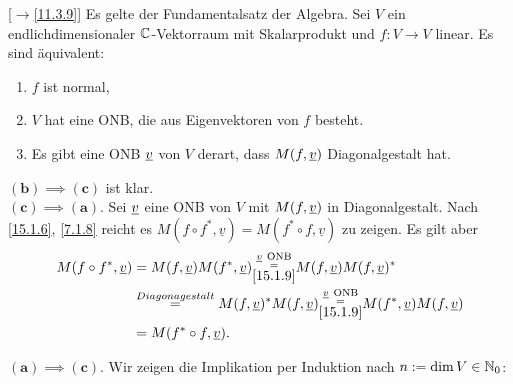 \documentclass[../../main.tex]{subfiles}
\begin{document}
\begin{sat}\mbox{}[$\to$\ref{11.3.9}]
\label{15.2.4}
Es gelte der Fundamentalsatz der Algebra. Sei $V$ ein endlichdimensionaler $\mathbb C$-Vektorraum mit Skalarprodukt und $f: V\to V$ linear. Es sind äquivalent:
\begin{enumerate}[\normalfont(a)]
\item $f$ ist normal,
\item $V$ hat eine ONB, die aus Eigenvektoren von $f$ besteht.
\item Es gibt eine ONB ${\underline v}$ von $V$ derart, dass $M(f,{\underline v})$ Diagonalgestalt hat.
\end{enumerate}
\end{sat}
\begin{cproof}
$\boldsymbol{(b)\implies(c)}$ ist klar.\\
	
\noindent$\boldsymbol{(c)\implies(a)}$. Sei ${\underline v}$ eine ONB von $V$ mit $M(f,{\underline v})$ in Diagonalgestalt. Nach \ref{15.1.6}, \ref{7.1.8} reicht es $M(f\circ f^*,\underline{v})=M(f^*\circ f,\underline{v})$ zu zeigen. Es gilt aber
\begin{align*}
M(f\circ f^*,\v)&=M(f,\v)M(f^*,\v)\substack{\v\ \text{ONB}\\=\\\ref{15.1.9}}M(f,\v)M(f,\v)^*\\
&\stackrel{\tiny Diagonagestalt}{=}M(f,\v)^*M(f,\v)\substack{\v\ \text{ONB}\\=\\\ref{15.1.9}}M(f^*,\v)M(f,\v)\\
&=M(f^*\circ f,\v).
\end{align*}

\noindent$\boldsymbol{(a)\implies(c)}$. Wir zeigen die Implikation per Induktion nach $n:=\dim V\in \mathbb N_0$:


\end{cproof}
\end{document}
